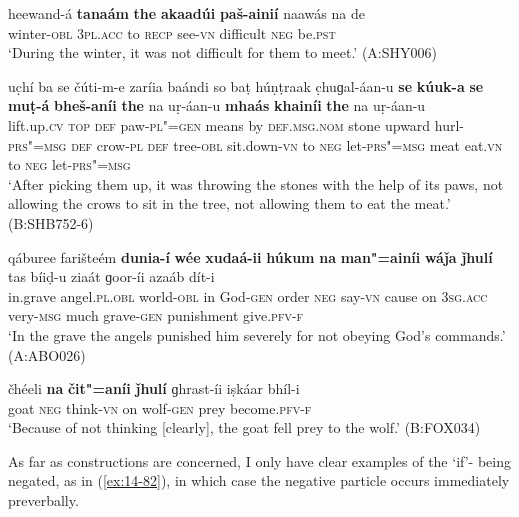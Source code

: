 \begin{exe}
\ex
\label{ex:14-78}
\gll heewand-á \textbf{tanaám} \textbf{the} \textbf{akaadúi} \textbf{paš-ainií} naawás  na de \\
winter-\textsc{obl} \textsc{3pl.acc} to \textsc{recp} see-\textsc{vn} difficult \textsc{neg}
be.\textsc{pst} \\
\glt `During the winter, it was not difficult for them to meet.' (A:SHY006)

\ex
\label{ex:14-79}
\gll uc̣hí ba se čúti-m-e zaríia baándi  so baṭ húṇṭraak c̣huɡal-áan-u  \textbf{se} \textbf{kúuk-a} \textbf{se} \textbf{muṭ-á} \textbf{bheš-aníi} \textbf{the} na uṛ-áan-u \textbf{mhaás} \textbf{khainíi} \textbf{the} na uṛ-áan-u\\
lift.up.\textsc{cv} \textsc{top} \textsc{def} paw-\textsc{pl"=gen} means by  \textsc{def.msg.nom} stone upward hurl-\textsc{prs"=msg}  \textsc{def} crow-\textsc{pl} \textsc{def} tree-\textsc{obl} sit.down-\textsc{vn} to \textsc{neg} let-\textsc{prs"=msg} meat eat.\textsc{vn} to \textsc{neg} let-\textsc{prs"=msg} \\
\glt `After picking them up, it was throwing the stones with the help of its paws, not allowing the crows to sit in the tree, not allowing them to eat the meat.' (B:SHB752-6)

\ex
\label{ex:14-80}
\gll qáburee farišteém \textbf{dunia-í} \textbf{wée} \textbf{xudaá-ii} \textbf{húkum} \textbf{na} \textbf{man"=ainíi} \textbf{wáǰa} \textbf{ǰhulí} tas bíiḍ-u ziaát  ɡoor-íi azaáb dít-i\\
in.grave angel.\textsc{pl.obl} world-\textsc{obl} in God-\textsc{gen} order \textsc{neg} say-\textsc{vn} cause on \textsc{3sg.acc} very-\textsc{msg} much grave-\textsc{gen} punishment give.\textsc{pfv-f}\\
\glt `In the grave the angels punished him severely for not obeying God's commands.' (A:ABO026)

\ex
\label{ex:14-81}
\gll čhéeli \textbf{na} \textbf{čit"=aníi} \textbf{ǰhulí} ɡhrast-íi iṣkáar bhíl-i \\
goat \textsc{neg} think-\textsc{vn} on wolf-\textsc{gen} prey become.\textsc{pfv-f} \\
\glt `Because of not thinking [clearly], the goat fell prey to the wolf.' (B:FOX034)
\end{exe}

As far as  constructions are concerned, I only have clear examples of the `if'- being negated, as in (\ref{ex:14-82}), in which case the negative particle occurs immediately preverbally.

